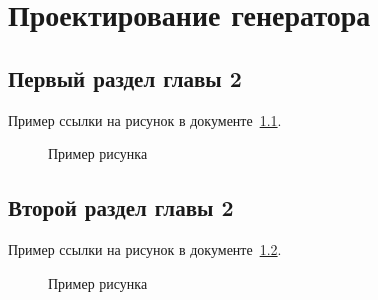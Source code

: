 \chapter{Проектирование генератора}

\section{Первый раздел главы 2}

Пример ссылки на рисунок в документе~\ref{fig:example02}.
\begin{figure}[h]
    \centering
    \caption{Пример рисунка}
    \label{fig:example02}
\end{figure}

\section{Второй раздел главы 2}

Пример ссылки на рисунок в документе~\ref{fig:example03}.
\begin{figure}[h]
    \centering
    \caption{Пример рисунка}
    \label{fig:example03}
\end{figure}
